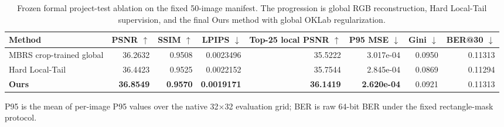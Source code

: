 \begin{table}[t]
  \centering
  \caption{Frozen formal project-test ablation on the fixed 50-image manifest. The progression is global RGB reconstruction, Hard Local-Tail supervision, and the final Ours method with global OKLab regularization.}
  \label{tab:final_method_ablation}
  \scriptsize
  \setlength{\tabcolsep}{4pt}
  \begin{tabular*}{\textwidth}{@{\extracolsep{\fill}}lrrrrrrr@{}}
    \toprule
    Method & PSNR $\uparrow$ & SSIM $\uparrow$ & LPIPS $\downarrow$ & Top-25 local PSNR $\uparrow$ & P95 MSE $\downarrow$ & Gini $\downarrow$ & BER@30 $\downarrow$ \\
    \midrule
    MBRS crop-trained global & 36.2632 & 0.9508 & 0.0023496 & 35.5222 & 3.017e-04 & 0.0950 & 0.11313 \\
    Hard Local-Tail & 36.4423 & 0.9525 & 0.0022152 & 35.7544 & 2.845e-04 & 0.0869 & 0.11294 \\
    \textbf{Ours} & \textbf{36.8549} & \textbf{0.9570} & \textbf{0.0019171} & \textbf{36.1419} & \textbf{2.620e-04} & 0.0921 & 0.11313 \\
    \bottomrule
  \end{tabular*}
  \vspace{2pt}
  \parbox{\textwidth}{\scriptsize P95 is the mean of per-image P95 values over the native 32$\times$32 evaluation grid; BER is raw 64-bit BER under the fixed rectangle-mask protocol.}
\end{table}
